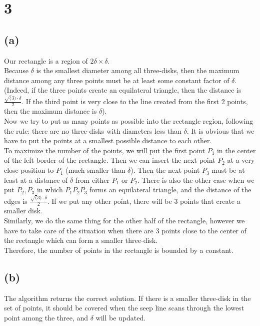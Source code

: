 \section*{3}
\subsection*{(a)}
Our rectangle is a region of $2 \delta \times \delta$. \\

Because $\delta$ is the smallest diameter among all three-disks, then the maximum distance among any three points must be at least some constant factor of $\delta$. (Indeed, if the three points create an equilateral triangle, then the distance is 
$\frac{\sqrt(3) \cdot \delta} {2}$. If the third point is very close to the line created from the first 2 points, then the maximum distance is $\delta$).\\

Now we try to put as many points as possible into the rectangle region, following the rule: there are no three-disks with diameters less than $\delta$. It is obvious that we have to put the points at a smallest possible distance to each other. \\

To maximize the number of the points, we will put the first point $P_1$ in the center of the left border of the rectangle. Then we can insert the next point $P_2$ at a very close position to $P_1$ (much smaller than $\delta$). Then the next point $P_3$ must be at least at a distance of $\delta$ from either $P_1$ or $P_2$. There is also the other case when we put $P_2, P_3$ in which $P_1P_2P_3$ forms an equilateral triangle, and the distance of the edges is $\frac{\sqrt(3) \cdot \delta} {2}$. If we put any other point, there will be 3 points that create a smaller disk. \\

Similarly, we do the same thing for the other half of the rectangle, however we have to take care of the situation when there are 3 points close to the center of the rectangle which can form a smaller three-disk. \\

Therefore, the number of points in the rectangle is bounded by a constant.

\subsection*{(b)}
The algorithm returns the correct solution. If there is a smaller three-disk in the set of points, it should be covered when the seep line scans through the lowest point among the three, and $\delta$ will be updated.\\

